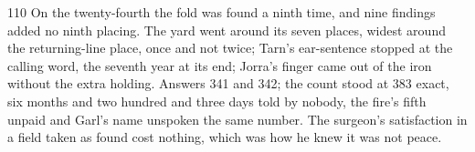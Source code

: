 \begin{CRchronicle}{110}
On the twenty-fourth the fold was found a ninth time, and nine findings added no ninth placing. The yard went around its seven places, widest around the returning-line place, once and not twice; Tarn’s ear-sentence stopped at the calling word, the seventh year at its end; Jorra’s finger came out of the iron without the extra holding. Answers 341 and 342; the count stood at 383 exact, six months and two hundred and three days told by nobody, the fire’s fifth unpaid and Garl’s name unspoken the same number. The surgeon’s satisfaction in a field taken as found cost nothing, which was how he knew it was not peace.
\end{CRchronicle}
